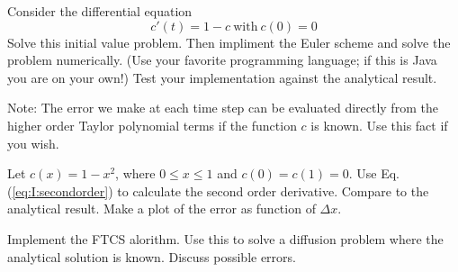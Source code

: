 \begin{exerciseregion}
    \begin{exercise}    
    Consider the differential equation
    \begin{equation}
        \label{eq:expl1}
		c'(t) = 1 - c \ \text{with} \ c(0) = 0
    \end{equation}
	Solve this initial value problem. Then impliment the Euler scheme and solve the
	problem numerically. (Use your favorite programming language; if this
	is Java you are on your own!)  Test your implementation against the
    analytical result.
    \end{exercise}
    
    \noindent Note: The error we make at each time step can be evaluated
    directly from the higher order Taylor polynomial terms if the function
    $c$ is known. Use this fact if you wish.

 \begin{exercise}
  Let $c(x) = 1-x^2$, where $0 \leq x \leq 1$ and $c(0)=c(1)=0$. Use
  Eq. (\ref{eq:I:secondorder}) to calculate the second order
  derivative. Compare to the analytical result. Make a plot of the
  error as function of $\Delta x$.   
\end{exercise}

\begin{exercise}
  Implement the FTCS alorithm. Use this to solve a diffusion problem
  where the analytical solution is known. Discuss possible errors.
\end{exercise}

\end{exerciseregion}
